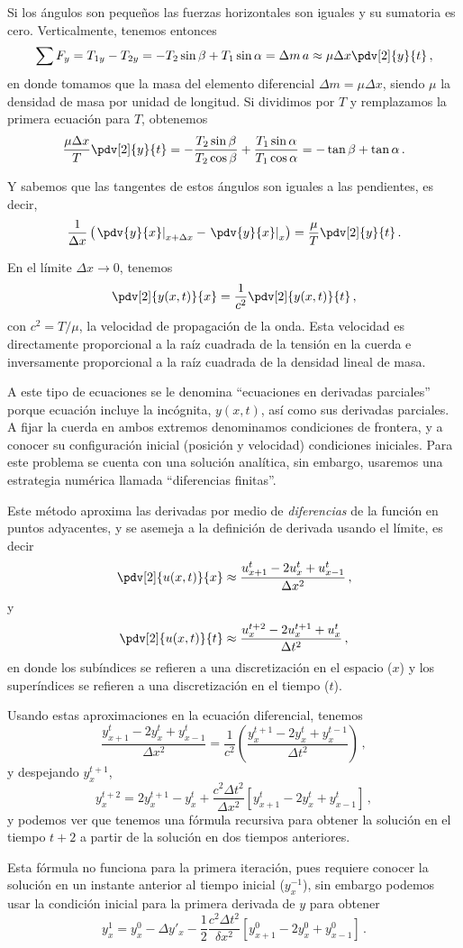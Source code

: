 Si los ángulos son pequeños las fuerzas horizontales son iguales y su sumatoria es cero. Verticalmente, tenemos entonces
\[\sum F_y = T_{1y} - T_{2y} = - T_2\sin\beta + T_1\sin\alpha = \Delta m\, a \approx \mu \Delta x \pdv[2]{y}{t}\, ,\]
en donde tomamos que la masa del elemento diferencial \(\Delta m = \mu \Delta x\), siendo \(\mu\) la densidad de masa por unidad de longitud. Si dividimos por \(T\) y remplazamos la primera ecuación  para \(T\), obtenemos
\[\frac{\mu \Delta x}{T}\pdv[2]{y}{t} = -\frac{T_2 \sin\beta}{T_2\cos\beta} + \frac{T_1\sin\alpha}{T_1\cos\alpha} = -\tan\beta + \tan\alpha\, .\]

Y sabemos que las tangentes de estos ángulos son iguales a las pendientes, es decir,
\[\frac{1}{\Delta x}\left(\left.\pdv{y}{x}\right|_{x + \Delta x} - \left.\pdv{y}{x}\right|_{x}\right) = \frac{\mu}{T}\pdv[2]{y}{t}\, .\]

En el límite \(\Delta x \rightarrow 0\), tenemos
\[\pdv[2]{y(x, t)}{x} = \frac{1}{c^2}\pdv[2]{y(x, t)}{t}\, ,\]
con \(c^2 = T/\mu\), la velocidad de propagación de la onda. Esta velocidad es directamente proporcional a la raíz cuadrada de la tensión en la cuerda e inversamente proporcional a la raíz cuadrada de la densidad lineal de masa.

A este tipo de ecuaciones se le denomina ``ecuaciones en derivadas parciales'' porque ecuación incluye la incógnita, \(y(x, t)\), así como sus derivadas parciales. A fijar la cuerda en ambos extremos denominamos condiciones de frontera, y a conocer su configuración inicial (posición y velocidad) condiciones iniciales. Para este problema se cuenta con una solución analítica, sin embargo, usaremos una estrategia numérica llamada ``diferencias finitas''.

Este método aproxima las derivadas por medio de \emph{diferencias} de la función en puntos adyacentes, y se asemeja a la definición de derivada usando el límite, es decir
\[\pdv[2]{u(x, t)}{x} \approx \frac{u_{x + 1}^t - 2 u_x^t + u_{x-1}^t}{\Delta x^2}\, ,\]
y
\[\pdv[2]{u(x, t)}{t} \approx \frac{u_x^{t + 2} - 2 u_x^{t + 1} + u_x^t}{\Delta t^2}\, ,\]
en donde los subíndices se refieren a una discretización en el espacio (\(x\)) y los superíndices se refieren a una discretización en el tiempo (\(t\)).

Usando estas aproximaciones en la ecuación diferencial, tenemos
\[\frac{y_{x + 1}^t - 2 y_x^t + y_{x-1}^t}{\Delta x^2} = \frac{1}{c^2}\left(\frac{y_x^{t + 1} - 2 y_x^t + y_x^{t - 1}}{\Delta t^2}\right)\, ,\]
y despejando \(y_x^{t+1}\),
\begin{equation}
  y_x^{t + 2} = 2 y_x^{t + 1} - y_x^t + \frac{c^2 \Delta t^2}{\Delta x^2}\left[y_{x+1}^t - 2y_x^t + y_{x-1}^t\right]\, ,
\end{equation}
y podemos ver que tenemos una fórmula recursiva para obtener la solución en el tiempo \(t + 2\) a partir de la solución en dos tiempos anteriores.

Esta fórmula no funciona para la primera iteración, pues requiere conocer la solución en un instante anterior al tiempo inicial (\(y_x^{-1}\)), sin embargo podemos usar la condición inicial para la primera derivada de \(y\) para obtener
\[y_x^1 = y_x^0 - \Delta y'_x - \frac{1}{2}\frac{c^2 \Delta t^2}{\delta x^2}\left[y_{x+1}^0 - 2y_x^0 + y_{x-1}^0\right]\, .\]